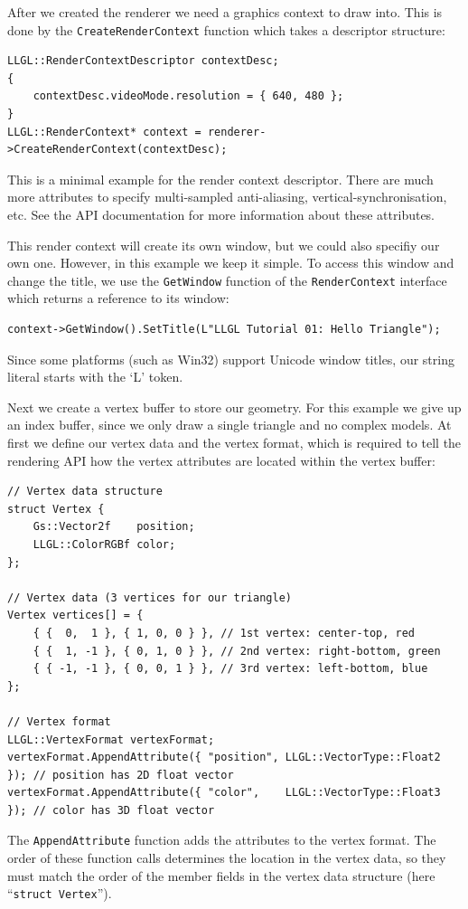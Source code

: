\documentclass{article}
\begin{document}
After we created the renderer we need a graphics context to draw into.
This is done by the \texttt{CreateRenderContext} function which takes a descriptor structure:
\begin{lstlisting}
LLGL::RenderContextDescriptor contextDesc;
{
    contextDesc.videoMode.resolution = { 640, 480 };
}
LLGL::RenderContext* context = renderer->CreateRenderContext(contextDesc);
\end{lstlisting}
This is a minimal example for the render context descriptor. There are much more attributes
to specify multi-sampled anti-aliasing, vertical-synchronisation, etc.
See the API documentation for more information about these attributes.

This render context will create its own window, but we could also specifiy our own one.
However, in this example we keep it simple. To access this window and change the title,
we use the \texttt{GetWindow} function of the \texttt{RenderContext} interface
which returns a reference to its window:
\begin{lstlisting}
context->GetWindow().SetTitle(L"LLGL Tutorial 01: Hello Triangle");
\end{lstlisting}
Since some platforms (such as Win32) support Unicode window titles, our string literal starts with the `L' token.

Next we create a vertex buffer to store our geometry. For this example we give up an index buffer,
since we only draw a single triangle and no complex models. At first we define our vertex data and the vertex format,
which is required to tell the rendering API how the vertex attributes are located within the vertex buffer:
\begin{lstlisting}
// Vertex data structure
struct Vertex {
    Gs::Vector2f    position;
    LLGL::ColorRGBf color;
};

// Vertex data (3 vertices for our triangle)
Vertex vertices[] = {
    { {  0,  1 }, { 1, 0, 0 } }, // 1st vertex: center-top, red
    { {  1, -1 }, { 0, 1, 0 } }, // 2nd vertex: right-bottom, green
    { { -1, -1 }, { 0, 0, 1 } }, // 3rd vertex: left-bottom, blue
};

// Vertex format
LLGL::VertexFormat vertexFormat;
vertexFormat.AppendAttribute({ "position", LLGL::VectorType::Float2 }); // position has 2D float vector
vertexFormat.AppendAttribute({ "color",    LLGL::VectorType::Float3 }); // color has 3D float vector
\end{lstlisting}
The \texttt{AppendAttribute} function adds the attributes to the vertex format.
The order of these function calls determines the location in the vertex data, so they must match
the order of the member fields in the vertex data structure (here ``\texttt{struct Vertex}'').
\end{document}
